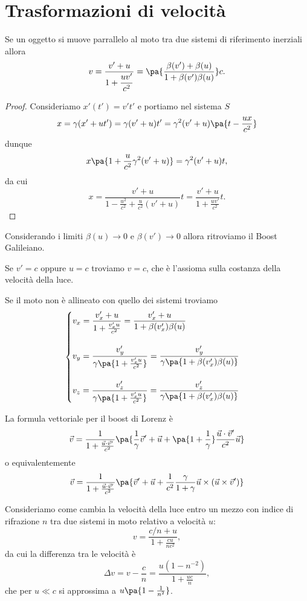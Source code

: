 \section{Trasformazioni di velocit\`a}
\begin{proposition}\label{FormulaBoost}
Se un oggetto si muove parrallelo al moto tra due sistemi di riferimento inerziali allora
\[v=\dfrac{v'+u}{\displaystyle 1+\frac{uv'}{c^2}}=\pa{\frac{\beta(v')+\beta(u)}{1+\beta(v')\beta(u)}}c.\]
\end{proposition}
\begin{proof}
Consideriamo $x'(t')=v't'$ e portiamo nel sistema $S$
\[x=\gamma(x'+ut')=\gamma(v'+u)t'=\gamma^2(v'+u)\pa{t-\frac{ux}{c^2}}\]
dunque
\[x\pa{1+\frac u{c^2}\gamma^2(v'+u)}=\gamma^2(v'+u)t,\]
da cui 
\[x=\frac{v'+u}{1-\frac{u^2}{c^2}+\frac u{c^2}(v'+u)}t=\frac{v'+u}{1+\frac{uv'}{c^2}}t.\]
\end{proof}

\begin{remark}
Considerando i limiti $\beta(u)\to 0$ e $\beta(v')\to 0$ allora ritroviamo il Boost Galileiano.
\end{remark}

\begin{remark}
Se $v'=c$ oppure $u=c$ troviamo $v=c$, che \`e l'assioma sulla costanza della velocit\`a della luce.
\end{remark}

\begin{remark}
Se il moto non \`e allineato con quello dei sistemi troviamo
\[\begin{cases}
\displaystyle v_x=\frac{v_x'+u}{1+\frac{v_x' u}{c^2}}=\frac{v_x'+u}{1+\beta(v'_x)\beta(u)}\\\\
\displaystyle v_y=\dfrac{v_y'}{\gamma\pa{1+\frac{v_x' u}{c^2}}}=\frac{v_y'}{\gamma\pa{1+\beta(v_x')\beta(u)}}\\\\
\displaystyle v_z=\dfrac{v_z'}{\gamma\pa{1+\frac{v_x' u}{c^2}}}=\frac{v_z'}{\gamma\pa{1+\beta(v_x')\beta(u)}}
\end{cases}\]
\end{remark}

\noindent La formula vettoriale per il boost di Lorenz \`e
\[\vec v=\frac1{1+\frac{\vec u\cdot \vec v'}{c^2}}\pa{\frac1\gamma \vec v'+\vec u+\pa{1+\frac1\gamma}\frac{\vec u\cdot \vec v'}{c^2}\vec u}\]
o equivalentemente
\[\vec v=\frac1{1+\frac{\vec u\cdot \vec v'}{c^2}}\pa{\vec v'+\vec u+\frac1{c^2}\frac{\gamma}{1+\gamma} \vec u\times (\vec u\times \vec v')}\]


\begin{example}
Consideriamo come cambia la velocit\`a della luce entro un mezzo con indice di rifrazione $n$ tra due sistemi in moto relativo a velocit\`a $u$:
\[v=\frac{c/n+u}{1+\frac{cu}{nc^2}},\]
da cui la differenza tra le velocit\`a \`e
\[\Delta v=v-\frac cn=\frac{u(1-n^{-2})}{1+\frac{uc}n},\]
che per $u\ll c$ si approssima a $u\pa{1-\frac1{n^2}}$.
\end{example}

